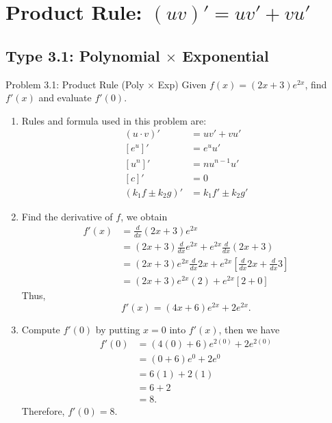 \documentclass[11pt,a4paper]{article}
\begin{document}
\section{Product Rule: $(uv)' = uv' + vu'$}

\subsection{Type 3.1: Polynomial $\times$ Exponential}
\begin{problembox}{Problem 3.1: Product Rule (Poly $\times$ Exp)}
Given $f(x) = (2x + 3)e^{2x}$, find $f'(x)$ and evaluate $f'(0)$.
\end{problembox}
\begin{solutionbox}
\begin{enumerate}
	\item [Step 1.] Rules and formula used in this problem are:
	\begin{align*}
		(u \cdot v)' &= u v' + v u' \\
		[e^u]' &= e^u u' \\
		[u^n]' &= n u^{n-1} u' \\
		[c]' &= 0 \\
		(k_1f \pm k_2 g)' &= k_1f' \pm k_2g'
	\end{align*}
	
	\item [Step 2.] Find the derivative of $f$, we obtain
	\begin{align*}
		f'(x) &= \frac{d}{dx} (2x + 3)e^{2x} \\
		&= (2x+3) \frac{d}{dx} e^{2x} + e^{2x} \frac{d}{dx} (2x + 3) \\
		&= (2x+3) e^{2x} \frac{d}{dx} 2x + e^{2x} \left[ \frac{d}{dx} 2x + \frac{d}{dx} 3 \right] \\
		&= (2x+3) e^{2x} (2) + e^{2x} \left[ 2 + 0 \right]
	\end{align*}
	Thus,
	\begin{equation*}
		f'(x) = (4x + 6) e^{2x} + 2e^{2x}.
	\end{equation*}
	
	\item [Step 3.] Compute $f'(0)$ by putting $x = 0$ into $f'(x)$, then we have
	\begin{align*}
		f'(0) &= (4(0) + 6) e^{2(0)} + 2e^{2(0)} \\
		&= (0+6) e^{0} + 2e^{0} \\
		&= 6(1) + 2(1) \\
		&= 6+2 \\
		&= 8.
	\end{align*}
	Therefore, $f'(0) = 8$.
\end{enumerate}
\end{solutionbox}
\end{document}

